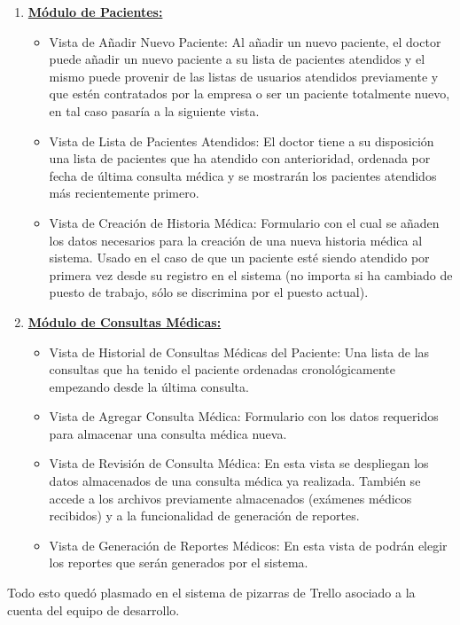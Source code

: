 \begin{enumerate}
        \item \textbf{\underline{Módulo de Pacientes:}}
        \begin{itemize}
            \item Vista de Añadir Nuevo Paciente: Al añadir un nuevo paciente, el doctor puede añadir un nuevo paciente a su lista de pacientes atendidos y el mismo puede provenir de las listas de usuarios atendidos previamente y que estén contratados por la empresa o ser un paciente totalmente nuevo, en tal caso pasaría a la siguiente vista.
            \item Vista de Lista de Pacientes Atendidos: El doctor tiene a su disposición una lista de pacientes que ha atendido con anterioridad, ordenada por fecha de última consulta médica y se mostrarán los pacientes atendidos más recientemente primero.
            \item Vista de Creación de Historia Médica: Formulario con el cual se añaden los datos necesarios para la creación de una nueva historia médica al sistema. Usado en el caso de que un paciente esté siendo atendido por primera vez desde su registro en el sistema (no importa si ha cambiado de puesto de trabajo, sólo se discrimina por el puesto actual).
        \end{itemize}
        
        \item \textbf{\underline{Módulo de Consultas Médicas:}}
        \begin{itemize}
            \item Vista de Historial de Consultas Médicas del Paciente: Una lista de las consultas que ha tenido el paciente ordenadas cronológicamente empezando desde la última consulta.
            \item Vista de Agregar Consulta Médica: Formulario con los datos requeridos para almacenar una consulta médica nueva.
            \item Vista de Revisión de Consulta Médica: En esta vista se despliegan los datos almacenados de una consulta médica ya realizada. También se accede a los archivos previamente almacenados (exámenes médicos recibidos) y a la funcionalidad de generación de reportes.
            \item Vista de Generación de Reportes Médicos: En esta vista de podrán elegir los reportes que serán generados por el sistema.            
        \end{itemize}
    \end{enumerate}
    
    Todo esto quedó plasmado en el sistema de pizarras de Trello asociado a la cuenta del equipo de desarrollo.
    
